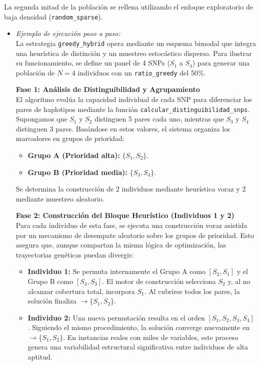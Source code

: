 \documentclass[a4paper,10pt]{article}
\begin{document}
La segunda mitad de la población se rellena utilizando el enfoque exploratorio de baja densidad (\texttt{random\_sparse}).
\begin{itemize}
    \item \textit{Ejemplo de ejecución paso a paso:} \\
    La estrategia \texttt{greedy\_hybrid} opera mediante un esquema bimodal que integra una heurística de distinción y un muestreo estocástico disperso. Para ilustrar su funcionamiento, se define un panel de 4 SNPs ($S_1$ a $S_4$) para generar una población de $N=4$ individuos con un \texttt{ratio\_greedy} del 50\%.
    
    \textbf{Fase 1: Análisis de Distinguibilidad y Agrupamiento} \\
    El algoritmo evalúa la capacidad individual de cada SNP para diferenciar los pares de haplotipos mediante la función \texttt{calcular\_distinguibilidad\_snps}. Supongamos que $S_1$ y $S_2$ distinguen 5 pares cada uno, mientras que $S_3$ y $S_4$ distinguen 3 pares. Basándose en estos valores, el sistema organiza los marcadores en grupos de prioridad:
    \begin{itemize}
        \item \textbf{Grupo A (Prioridad alta):} $\{S_1, S_2\}$.
        \item \textbf{Grupo B (Prioridad media):} $\{S_3, S_4\}$.
    \end{itemize}
    Se determina la construcción de 2 individuos mediante heurística voraz y 2 mediante muestreo aleatorio.

    \textbf{Fase 2: Construcción del Bloque Heurístico (Individuos 1 y 2)} \\
    Para cada individuo de esta fase, se ejecuta una construcción voraz asistida por un mecanismo de desempate aleatorio sobre los grupos de prioridad. Esto asegura que, aunque compartan la misma lógica de optimización, las trayectorias genéticas puedan divergir:
    \begin{itemize}
        \item \textbf{Individuo 1:} Se permuta internamente el Grupo A como $[S_2, S_1]$ y el Grupo B como $[S_4, S_3]$. El motor de construcción selecciona $S_2$ y, al no alcanzar cobertura total, incorpora $S_1$. Al cubrirse todos los pares, la solución finaliza $\rightarrow \{S_1, S_2\}$.
        \item \textbf{Individuo 2:} Una nueva permutación resulta en el orden $[S_1, S_2, S_3, S_4]$. Siguiendo el mismo procedimiento, la solución converge nuevamente en $\rightarrow \{S_1, S_2\}$. En instancias reales con miles de variables, este proceso genera una variabilidad estructural significativa entre individuos de alta aptitud.
    \end{itemize}


\end{itemize}
\end{document}

